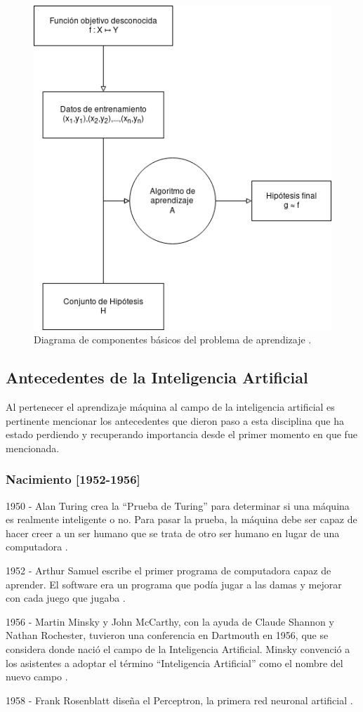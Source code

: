 \FloatBarrier
\begin{figure}[htbp!]
		\centering
			\includegraphics[width=.45 \textwidth]{imagenes/elementosAprendizaje}
		\caption{Diagrama de componentes básicos del problema de aprendizaje \cite{Mostafa}.}
		\label{image:componentesmachine}
\end{figure}


\FloatBarrier


\subsection{Antecedentes de la Inteligencia Artificial}
Al pertenecer el aprendizaje máquina al campo de la inteligencia artificial es pertinente mencionar los antecedentes que dieron paso a esta disciplina que ha estado perdiendo y recuperando importancia desde el primer momento en que fue mencionada.  \\
\subsubsection{Nacimiento [1952-1956]}
1950 - Alan Turing crea la ``Prueba de Turing'' para determinar si una máquina es realmente inteligente o no. Para pasar la prueba, la máquina debe ser capaz de hacer creer a un ser humano que se trata de otro ser humano en lugar de una computadora \cite{V.Gonzalez}.
\\ \par
1952 - Arthur Samuel escribe el primer programa de computadora capaz de aprender. El software era un programa que podía jugar a las damas y mejorar con cada juego que jugaba \cite{V.Gonzalez}.
\\ \par
1956 - Martin Minsky y John McCarthy, con la ayuda de Claude Shannon y Nathan Rochester, tuvieron una conferencia en Dartmouth en 1956, que se considera donde nació el campo de la Inteligencia Artificial. Minsky convenció a los asistentes a adoptar el término ``Inteligencia Artificial'' como el nombre del nuevo campo \cite{V.Gonzalez}.
\\ \par
1958 - Frank Rosenblatt diseña el Perceptron, la primera red neuronal artificial \cite{V.Gonzalez}.
\\ \par
